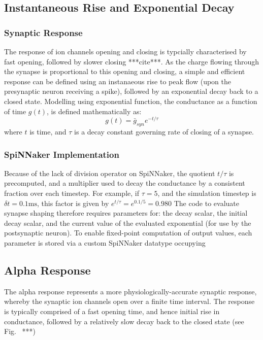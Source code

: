 \documentclass[12pt]{article}
\begin{document}
\subsection{Instantaneous Rise and Exponential Decay}
\subsubsection*{Synaptic Response}
The response of ion channels opening and closing is typcially characterised by
fast opening, followed by slower closing ***cite***. As the charge flowing
through the synapse is proportional to this opening and closing, a simple and
efficient response can be defined using an instanaeous rise to peak flow (upon
the presynaptic neuron receiving a spike), followed by an exponential decay
back to a closed state. Modelling using exponential function, the conductance
as a function of time $g(t)$, is defined mathematically as:
\begin{equation}
g(t) = \bar{g}_{syn} e^{-t/\tau}
\end{equation}
where $t$ is time, and $\tau$ is a decay constant governing rate of closing of a
synapse.

\subsubsection*{SpiNNaker Implementation}
Because of the lack of division operator on SpiNNaker, the quotient $t/\tau$ is
precomputed, and a multiplier used to decay the conductance by a consistent
fraction over each timestep. For example, if $\tau = 5$, and the simulation
timestep is $\delta t = 0.1 \mathrm{ms}$, this factor is given by $e^{t/\tau} =
e^{0.1/5} = 0.980$
The code to evaluate synapse shaping therefore requires parameters for: the
decay scalar, the initial decay scalar, and the current value of the evaluated
exponential (for use by the postsynaptic neuron). To enable fixed-point
computation of output values, each parameter is stored via a custom SpiNNaker
datatype occupying

\subsection{Alpha Response}
The alpha response represents a more physiologically-accurate synaptic response,
whereby the synaptic ion channels open over a finite time interval. The
response is typically comprised of a fast opening time, and hence initial rise
in conductance, followed by a relatively slow decay back to the closed state (see
Fig.~ ***)
\end{document}
